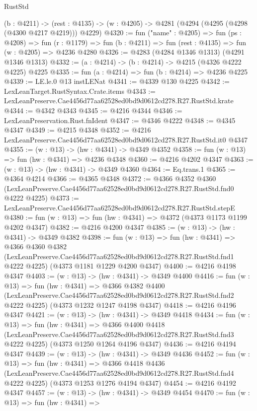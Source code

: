\begin{lexlean}{RustStd}
\begin{coremodule}
  (b : @4211) ->
  (rest : @4135) -> (w : @4205) -> @4281 (@4294 (@4295 (@4298 (@4300 @4217 @4219))) @4229)
@4320 := fun ("name" : @4205) =>
  fun (ps : @4208) =>
  fun (r : @1179) => fun (b : @4211) => fun (rest : @4135) => fun (w : @4205) => @4236 @4280
@4326 := @4283 (@4284 @1346 @1313) (@4291 @1346 @1313)
@4332 := (a : @4214) -> (b : @4214) -> @4215 (@4326 @4222 @4225) @4225
@4335 := fun (a : @4214) => fun (b : @4214) => @4236 @4225
@4339 := LE.le.{0} @13 instLENat
@4341 := @4339 @130 @4225
@4342 := LexLeanTarget.RustSyntax.Crate.items
@4343 := LexLeanPreserve.Cae4456d77aa62528ed0bd9d0612cd278.R27.RustStd.krate
@4344 := @4342 @4343
@4345 := @4216 @4344
@4346 := LexLeanPreservation.Rust.fnIdent
@4347 := @4346 @4222
@4348 := @4345 @4347
@4349 := @4215 @4348
@4352 := @4216 LexLeanPreserve.Cae4456d77aa62528ed0bd9d0612cd278.R27.RustStd.it0 @4347
@4355 := (w : @13) -> (hw : @4341) -> @4349 @4352
@4358 := fun (w : @13) => fun (hw : @4341) => @4236 @4348
@4360 := @4216 @4202 @4347
@4363 := (w : @13) -> (hw : @4341) -> @4349 @4360
@4364 := Eq.trans.{1}
@4365 := @4364 @4214
@4366 := @4365 @4348
@4372 := @4366
    @4352
    @4360
    (LexLeanPreserve.Cae4456d77aa62528ed0bd9d0612cd278.R27.RustStd.fnd0 @4222 @4225)
@4373 := LexLeanPreserve.Cae4456d77aa62528ed0bd9d0612cd278.R27.RustStd.stepE
@4380 := fun (w : @13) => fun (hw : @4341) => @4372 (@4373 @1173 @1199 @4202 @4347)
@4382 := @4216 @4200 @4347
@4385 := (w : @13) -> (hw : @4341) -> @4349 @4382
@4398 := fun (w : @13) =>
  fun (hw : @4341) =>
  @4366
    @4360
    @4382
    (LexLeanPreserve.Cae4456d77aa62528ed0bd9d0612cd278.R27.RustStd.fnd1 @4222 @4225)
    (@4373 @1181 @1229 @4200 @4347)
@4400 := @4216 @4198 @4347
@4403 := (w : @13) -> (hw : @4341) -> @4349 @4400
@4416 := fun (w : @13) =>
  fun (hw : @4341) =>
  @4366
    @4382
    @4400
    (LexLeanPreserve.Cae4456d77aa62528ed0bd9d0612cd278.R27.RustStd.fnd2 @4222 @4225)
    (@4373 @1232 @1247 @4198 @4347)
@4418 := @4216 @4196 @4347
@4421 := (w : @13) -> (hw : @4341) -> @4349 @4418
@4434 := fun (w : @13) =>
  fun (hw : @4341) =>
  @4366
    @4400
    @4418
    (LexLeanPreserve.Cae4456d77aa62528ed0bd9d0612cd278.R27.RustStd.fnd3 @4222 @4225)
    (@4373 @1250 @1264 @4196 @4347)
@4436 := @4216 @4194 @4347
@4439 := (w : @13) -> (hw : @4341) -> @4349 @4436
@4452 := fun (w : @13) =>
  fun (hw : @4341) =>
  @4366
    @4418
    @4436
    (LexLeanPreserve.Cae4456d77aa62528ed0bd9d0612cd278.R27.RustStd.fnd4 @4222 @4225)
    (@4373 @1253 @1276 @4194 @4347)
@4454 := @4216 @4192 @4347
@4457 := (w : @13) -> (hw : @4341) -> @4349 @4454
@4470 := fun (w : @13) =>
  fun (hw : @4341) =>

\end{coremodule}
\end{lexlean}
